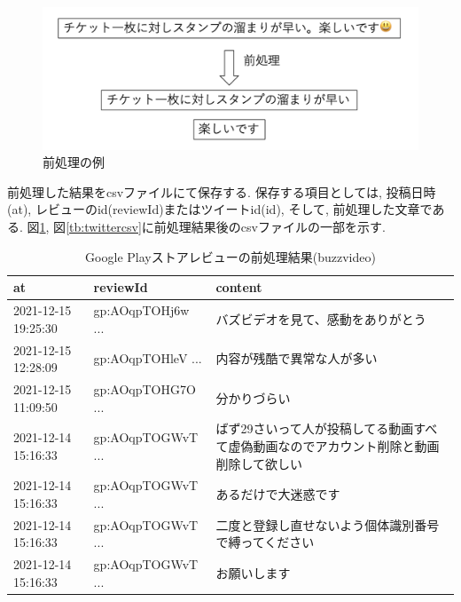 \begin{figure}[hbtp]
 \centering
 \includegraphics[scale=0.5]
      {contents/images/preprocessing.png}
 \caption{前処理の例\label{fig:preprocessing}}
\end{figure}

前処理した結果をcsvファイルにて保存する. 保存する項目としては, 投稿日時(at), レビューのid(reviewId)またはツイートid(id), そして, 前処理した文章である. 図\ref{tb:googlecsv}, 図\ref{tb:twittercsv}に前処理結果後のcsvファイルの一部を示す. 

\begin{table}[htbp]
  \caption{Google Playストアレビューの前処理結果(buzzvideo)}
  \label{tb:googlecsv}
  \begin{center}
  \begin{tabularx}{\linewidth}{|l|l|X|}
    \hline
    at&reviewId&content\\\hline\hline
    2021-12-15 19:25:30&gp:AOqpTOHj6w ...&バズビデオを見て、感動をありがとう\\\hline
    2021-12-15 12:28:09&gp:AOqpTOHleV ...&内容が残酷で異常な人が多い\\\hline
    2021-12-15 11:09:50&gp:AOqpTOHG7O ...&分かりづらい\\\hline
    2021-12-14 15:16:33&gp:AOqpTOGWvT ...&ばず29さいって人が投稿してる動画すべて虚偽動画なのでアカウント削除と動画削除して欲しい\\\hline
    2021-12-14 15:16:33&gp:AOqpTOGWvT ...&あるだけで大迷惑です\\\hline
    2021-12-14 15:16:33&gp:AOqpTOGWvT ...&二度と登録し直せないよう個体識別番号で縛ってください\\\hline
    2021-12-14 15:16:33&gp:AOqpTOGWvT ...&お願いします\\\hline
  \end{tabularx}\end{center}
\end{table}

